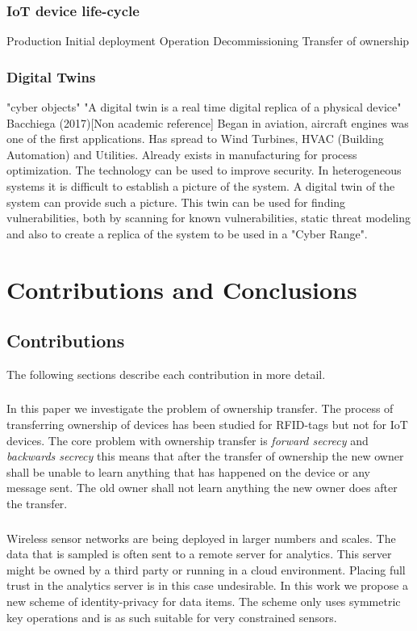 \subsection{IoT device life-cycle}
Production
Initial deployment
Operation
Decommissioning
Transfer of ownership

\subsection{Digital Twins}
"cyber objects"
"A digital twin is a real time digital replica of a physical device" 	Bacchiega (2017)[Non academic reference]
Began in aviation, aircraft engines was one of the first applications. Has spread to Wind Turbines, HVAC (Building Automation) and Utilities. 
Already exists in manufacturing for process optimization. The technology can be used to improve security. In heterogeneous systems it is difficult to establish a picture of the system. A digital twin of the system can provide such a picture. This twin can be used for finding vulnerabilities, both by scanning for known vulnerabilities, static threat modeling and also to create a replica of the system to be used in a "Cyber Range". 

\chapter{Contributions and Conclusions}
\section{Contributions}
The following sections describe each contribution in more detail.

\subsection{\paperItitle}
In this paper we investigate the problem of ownership transfer. The process of transferring ownership of devices has been studied for RFID-tags but not for IoT devices. The core problem with ownership transfer is \emph{forward secrecy} and \emph{backwards secrecy} this means that after the transfer of ownership the new owner shall be unable to learn anything that has happened on the device or any message sent. The old owner shall not learn anything the new owner does after the transfer.

\subsection{\paperIItitle}
Wireless sensor networks are being deployed in larger numbers and scales. The data that is sampled is often sent to a remote server for analytics. This server might be owned by a third party or running in a cloud environment. Placing full trust in the analytics server is in this case undesirable. In this work we propose a new scheme of identity-privacy for data items. The scheme only uses symmetric key operations and is as such suitable for very constrained sensors.

